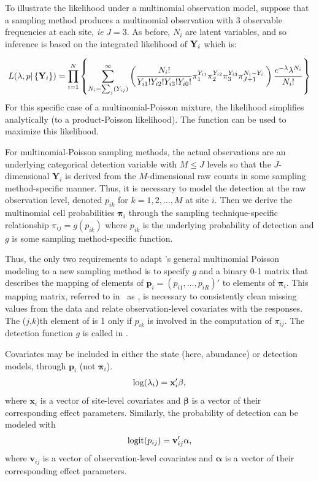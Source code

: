 \documentclass[article,shortnames]{jss}
\DeclareMathOperator{\logit}{logit}
\newcommand{\um}{\pkg{unmarked}}
\begin{document}
To illustrate the likelihood under a multinomial observation model,
suppose that a sampling method produces a multinomial observation
with 3 observable frequencies at each site, {\it ie} $J=3$. As before,
$N_i$ are latent variables, and so inference is based on the integrated
likelihood of ${\bf Y}_{i}$ which is:

\begin{equation}
L(\lambda, p | \left\{{\bf Y}_i\right\}) =
 \prod_{i=1}^{N} \left\{
  \sum_{N_{i}=\sum_{j}(Y_{ij})}^{\infty} \left(
 \frac{N_{i}!}{ Y_{i1}! Y_{i2}! Y_{i3}! Y_{i0}!}
  \pi_{1}^{Y_{i1}}
  \pi_{2}^{Y_{i2}}
  \pi_{3}^{Y_{i3}}
  \pi_{J+1}^{N_{i}- Y_{i.}} \right)
 \frac{e^{-\lambda} \lambda^{N_i}}{N_i!} \right\}
\end{equation}
For this specific case of a multinomial-Poisson mixture, the likelihood
simplifies analytically (to a product-Poisson likelihood).
The function  can be used to maximize this likelihood.

For multinomial-Poisson sampling methods, the actual observations are
an underlying categorical detection variable with $M \leq J$ levels so
that the $J$-dimensional $\mathbf Y_{i}$ is derived from the
$M$-dimensional raw counts in some sampling method-specific manner.
Thus, it is necessary to model the detection at the raw observation
level, denoted $p_{ik}$ for $k=1,2,\dots,M$ at site $i$.  Then we
derive the multinomial cell probabilities $\boldsymbol \pi_{i}$
through the sampling technique-specific relationship
$\pi_{ij}=g(p_{ik})$ where $p_{ik}$ is the underlying probability of
detection and $g$ is some sampling method-specific function.

Thus, the only two requirements to adapt \um's general multinomial Poisson
modeling to a new sampling method is to specify $g$ and a binary 0-1
matrix that describes the mapping of elements of
$\mathbf p_{i} = (p_{i1},\dots,p_{iR})'$ to elements of
$\boldsymbol \pi_{i}$.  This mapping matrix, referred to in
\um\ as , is necessary to consistently clean
missing values from the data and relate observation-level covariates
with the responses.  The ($j$,$k$)th element of
 is 1 only if $p_{ik}$ is involved in the computation of
$\pi_{ij}$.  The detection function $g$ is called  in \um.

Covariates may be included in either the
state (here, abundance) or detection models, through $\mathbf p_{i}$
(not $\boldsymbol \pi_{i}$).
\begin{gather}
  \log(\lambda_i) = \mathbf x_i' \mathbf \beta, \notag
\end{gather}
where $\mathbf x_i$ is a vector of site-level covariates and $\mathbf \beta$
is a vector of their corresponding effect parameters.  Similarly, the
probability of detection can be modeled with
\begin{gather}
  \logit(p_{ij}) = \mathbf v_{ij}' \mathbf \alpha, \notag
\end{gather}
where $\mathbf v_{ij}$ is a vector of observation-level covariates and
$\mathbf \alpha$ is a vector of their corresponding effect parameters.
\end{document}
